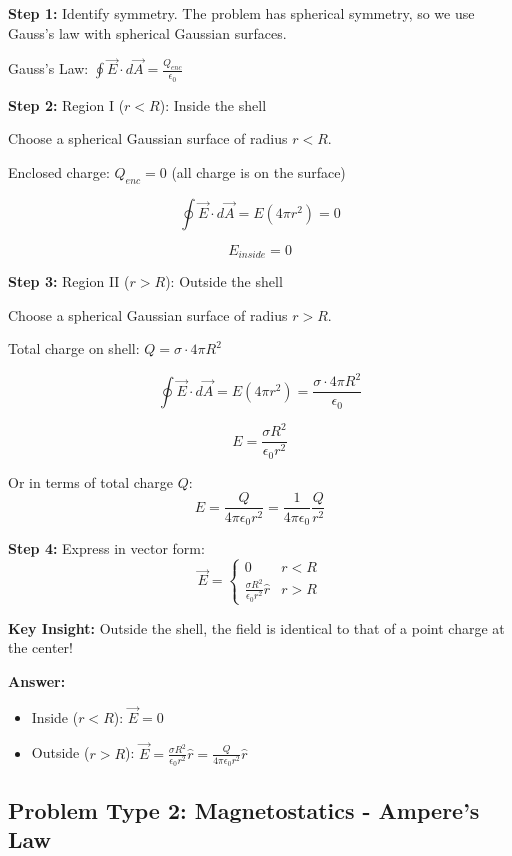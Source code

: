 \documentclass[12pt,a4paper]{article}
\begin{document}
\begin{solution}
\textbf{Step 1:} Identify symmetry. The problem has spherical symmetry, so we use Gauss's law with spherical Gaussian surfaces.

Gauss's Law: $\oint \vec{E} \cdot d\vec{A} = \frac{Q_{enc}}{\epsilon_0}$

\textbf{Step 2:} Region I ($r < R$): Inside the shell

Choose a spherical Gaussian surface of radius $r < R$.

Enclosed charge: $Q_{enc} = 0$ (all charge is on the surface)

$$\oint \vec{E} \cdot d\vec{A} = E(4\pi r^2) = 0$$

$$E_{inside} = 0$$

\textbf{Step 3:} Region II ($r > R$): Outside the shell

Choose a spherical Gaussian surface of radius $r > R$.

Total charge on shell: $Q = \sigma \cdot 4\pi R^2$

$$\oint \vec{E} \cdot d\vec{A} = E(4\pi r^2) = \frac{\sigma \cdot 4\pi R^2}{\epsilon_0}$$

$$E = \frac{\sigma R^2}{\epsilon_0 r^2}$$

Or in terms of total charge $Q$:
$$E = \frac{Q}{4\pi\epsilon_0 r^2} = \frac{1}{4\pi\epsilon_0}\frac{Q}{r^2}$$

\textbf{Step 4:} Express in vector form:
$$\vec{E} = \begin{cases}
0 & r < R \\
\frac{\sigma R^2}{\epsilon_0 r^2}\hat{r} & r > R
\end{cases}$$

\textbf{Key Insight:} Outside the shell, the field is identical to that of a point charge at the center!

\textbf{Answer:}
\begin{itemize}
    \item Inside ($r < R$): $\vec{E} = 0$
    \item Outside ($r > R$): $\vec{E} = \frac{\sigma R^2}{\epsilon_0 r^2}\hat{r} = \frac{Q}{4\pi\epsilon_0 r^2}\hat{r}$
\end{itemize}
\end{solution}

\subsection{Problem Type 2: Magnetostatics - Ampere's Law}
\end{document}
